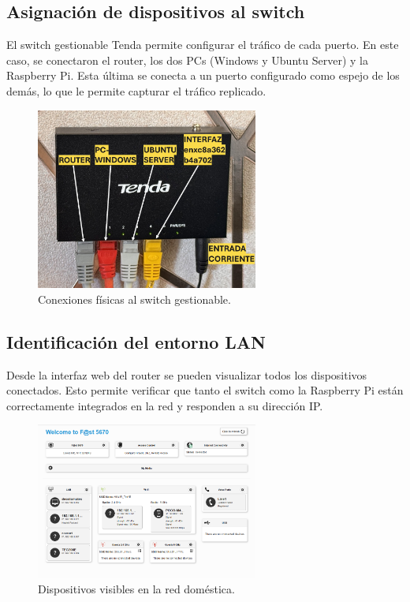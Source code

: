 \documentclass[11pt,a4paper,twoside]{report}
\begin{document}
\pagebreak

\subsection*{Asignación de dispositivos al switch}

El switch gestionable Tenda permite configurar el tráfico de cada puerto. En este caso, se conectaron el router, los dos PCs (Windows y Ubuntu Server) y la Raspberry Pi. Esta última se conecta a un puerto configurado como espejo de los demás, lo que le permite capturar el tráfico replicado.

\begin{figure}[H]
	\centering
	\includegraphics[width=0.65\textwidth]{pruebas_config/2-2.JPG}
	\caption{Conexiones físicas al switch gestionable.}
\end{figure}

\subsection*{Identificación del entorno LAN}

Desde la interfaz web del router se pueden visualizar todos los dispositivos conectados. Esto permite verificar que tanto el switch como la Raspberry Pi están correctamente integrados en la red y responden a su dirección IP.

\begin{figure}[H]
	\centering
	\includegraphics[width=0.65\textwidth]{pruebas_config/3-router.png}
	\caption{Dispositivos visibles en la red doméstica.}
\end{figure}
\end{document}
